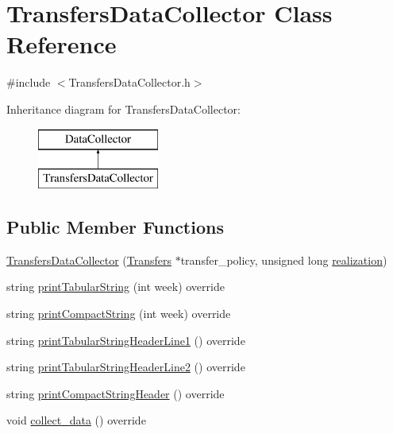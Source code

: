 \hypertarget{classTransfersDataCollector}{}\section{Transfers\+Data\+Collector Class Reference}
\label{classTransfersDataCollector}


{\ttfamily \#include $<$Transfers\+Data\+Collector.\+h$>$}

Inheritance diagram for Transfers\+Data\+Collector\+:\begin{figure}[H]
\begin{center}
\leavevmode
\includegraphics[height=2.000000cm]{classTransfersDataCollector}
\end{center}
\end{figure}
\subsection*{Public Member Functions}
\begin{DoxyCompactItemize}
\item 
\mbox{\hyperlink{classTransfersDataCollector_a757289856b49a212a16b6263bfab8b7d}{Transfers\+Data\+Collector}} (\mbox{\hyperlink{classTransfers}{Transfers}} $\ast$transfer\+\_\+policy, unsigned long \mbox{\hyperlink{classDataCollector_a9ef2887466fe3123aa19ef956a219b96}{realization}})
\item 
string \mbox{\hyperlink{classTransfersDataCollector_a292b907e5c1000d8b3d868409637b9a6}{print\+Tabular\+String}} (int week) override
\item 
string \mbox{\hyperlink{classTransfersDataCollector_aa5385877143c67a4d300032160239cfe}{print\+Compact\+String}} (int week) override
\item 
string \mbox{\hyperlink{classTransfersDataCollector_a7c797fbccf4326b206b29529059dd622}{print\+Tabular\+String\+Header\+Line1}} () override
\item 
string \mbox{\hyperlink{classTransfersDataCollector_ade6b896383f079d8973076e6b9a8053a}{print\+Tabular\+String\+Header\+Line2}} () override
\item 
string \mbox{\hyperlink{classTransfersDataCollector_a29750b8b76fa82d70d4f472a0e36ceba}{print\+Compact\+String\+Header}} () override
\item 
void \mbox{\hyperlink{classTransfersDataCollector_a2f5c4427699aab547ea0d3b74993752b}{collect\+\_\+data}} () override
\end{DoxyCompactItemize}
